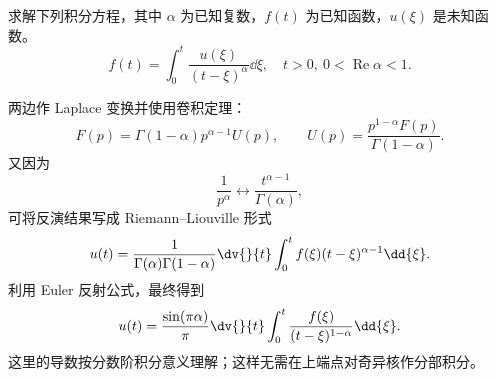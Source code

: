\begin{question}
求解下列积分方程，其中 \(\alpha\) 为已知复数，\(f(t)\) 为已知函数，\(u(\xi)\) 是未知函数。\[ f(t)=\int_0^t \frac{u(\xi)}{(t-\xi)^\alpha}\dd{\xi},\quad t>0,\ 0<\operatorname{Re}\alpha<1. \]
\begin{solution}
两边作 Laplace 变换并使用卷积定理：
\[
F(p)=\Gamma(1-\alpha)p^{\alpha-1}U(p),
\qquad
U(p)=\frac{p^{1-\alpha}F(p)}{\Gamma(1-\alpha)}.
\]
又因为
\[
\frac1{p^\alpha}
\longleftrightarrow
\frac{t^{\alpha-1}}{\Gamma(\alpha)},
\]
可将反演结果写成 Riemann--Liouville 形式
\[
u(t)
=\frac{1}{\Gamma(\alpha)\Gamma(1-\alpha)}
\dv{}{t}\int_0^t f(\xi)(t-\xi)^{\alpha-1}\dd{\xi}.
\]
利用 Euler 反射公式，最终得到
\[
u(t)
=\frac{\sin(\pi\alpha)}{\pi}
\dv{}{t}\int_0^t
\frac{f(\xi)}{(t-\xi)^{1-\alpha}}\dd{\xi}.
\]
这里的导数按分数阶积分意义理解；这样无需在上端点对奇异核作分部积分。
\end{solution}
\end{question}

